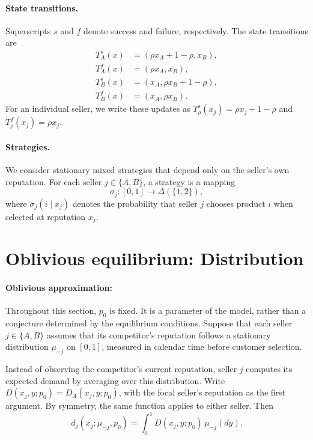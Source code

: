 \documentclass[11pt]{article}
\begin{document}
\paragraph{State transitions.}
Superscripts $s$ and $f$ denote success and failure,
respectively. The state transitions are
\begin{equation}
\begin{aligned}
T_A^s(x)&=(\rho x_A+1-\rho,x_B),\\
T_A^f(x)&=(\rho x_A,x_B),\\
T_B^s(x)&=(x_A,\rho x_B+1-\rho),\\
T_B^f(x)&=(x_A,\rho x_B).
\end{aligned}
\end{equation}
For an individual seller, we write these updates as
$T_\rho^s(x_j)=\rho x_j+1-\rho$ and $T_\rho^f(x_j)=\rho x_j$.

\paragraph{Strategies.}
We consider stationary mixed strategies that depend only
on the seller's own reputation. For each seller $j\in\{A,B\}$,
a strategy is a mapping
\begin{equation}
\sigma_j:[0,1]\rightarrow\Delta(\{1,2\}),
\end{equation}
where $\sigma_j(i\mid x_j)$ denotes the probability that
seller $j$ chooses product $i$ when selected at reputation
$x_j$.

\section{Oblivious equilibrium: Distribution}

\paragraph{Oblivious approximation:}
Throughout this section, $p_0$ is fixed. It is a parameter of the model,
rather than a conjecture determined by the equilibrium conditions.
Suppose that each seller $j\in\{A,B\}$ assumes that
its competitor's reputation follows a stationary distribution
$\mu_{-j}$ on $[0,1]$, measured in calendar time before customer selection.

Instead of observing the competitor's current reputation,
seller $j$ computes its expected demand by averaging over
this distribution. Write $D(x_j,y;p_0)=D_A(x_j,y;p_0)$, with the
focal seller's reputation as the first argument. By symmetry, the same
function applies to either seller. Then
\begin{equation}
d_j(x_j;\mu_{-j},p_0)
=
\int_0^1 D(x_j,y;p_0)\,\mu_{-j}(dy).
\end{equation}
\end{document}
